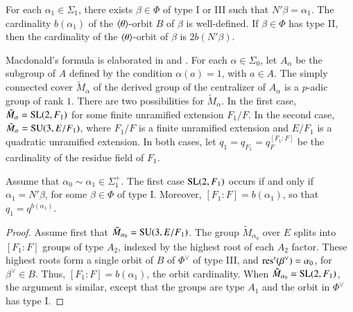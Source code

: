 For each $\alpha_1\in\Sigma_1$, there exists $\beta\in\Phi$ of
type I or III such that $N'\beta = \alpha_1$.  The cardinality $b(\alpha_1)$
of the $\langle{\theta}\rangle$-orbit $B$ of $\beta$ is well-defined.  If $\beta\in\Phi$ has type II,
then the cardinality of the $\langle{\theta}\rangle$-orbit of $\beta$ is $2b(N'\beta)$.

Macdonald's formula is elaborated 
in \cite{casselman1980unramified} and \cite{casselman2005companion}.
For each $\alpha\in \Sigma_0$, let $A_{\alpha}$ be the subgroup of $A$ defined by the condition $\alpha(a)=1$, with $a\in A$.
The simply connected cover $\tilde M_\alpha$ of the derived group of the centralizer of $A_\alpha$ is a $p$-adic
group of rank $1$.  There are two possibilities for $\tilde M_\alpha$.  In the first case, $\tilde M_\alpha = {\operatorname{SL}}(2,F_1)$ for
some finite unramified extension $F_1/F$.  In the second case, $\tilde M_\alpha = {\operatorname{SU}}(3,E/F_1)$, where $F_1/F$ is 
a finite unramified extension and $E/F_1$ is a quadratic unramified extension.  In both cases, 
let $q_1 = q_{F_1} = q_F^{[F_1:F]}$ be the cardinality
of the residue field of $F_1$.


\begin{lemma}
Assume that $\alpha_0\sim\alpha_1\in\Sigma^+_1$.  
The first case ${\operatorname{SL}}(2,F_1)$ occurs if and only if $\alpha_1=N'\beta$, for some $\beta\in\Phi$ of type I.
Moreover, $[F_1:F] = b(\alpha_1)$, so that $q_1 = q^{b(\alpha_1)}$.
\end{lemma}

\begin{proof}  
Assume first that $\tilde M_{\alpha_0} = {\operatorname{SU}}(3,E/F_1)$.
The group $\tilde M_{\alpha_0}$ over $E$ splits into $[F_1:F]$ groups of type $A_2$, indexed by the highest root
of each $A_2$ factor.  These highest roots form a single orbit of $B$ of $\Phi^\vee$ of type III, and ${\operatorname{res}}'(\beta^\vee)=\alpha_0$,
for $\beta^\vee\in B$.  Thus, $[F_1:F]= b(\alpha_1)$, the orbit cardinality.
When $\tilde M_{\alpha_0} = {\operatorname{SL}}(2,F_1)$, the argument is similar, except that the groups are type $A_1$ and the orbit in $\Phi^\vee$
has type I.  %
\end{proof}

